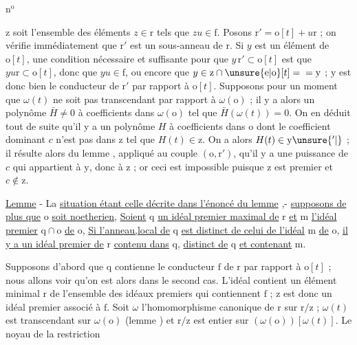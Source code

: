 n$^{\mathrm{o}}$ 

$\mathrm z$ soit l'ensemble des éléments $z\in\mathrm r$ tels que $zu\in\mathrm f$.
Posons $\mathrm r'=\mathrm o[t]+u\mathrm r$ ; on vérifie immédiatement que $\mathrm r'$
est un sous-anneau de $\mathrm r$. Si $y$ est un élément de $\mathrm o[t]$, une
condition nécessaire et suffisante pour que $y\,\mathrm r'\subset\mathrm o[t]$ est
que $yu\mathrm r\subset\mathrm o[t]$, donc que $yu\in\mathrm f$, ou encore que $y\in\mathrm z\cap\unsure{\mathrm e|\mathrm o}[t]={}
=\mathrm y$ ; $\mathrm y$ est donc bien le conducteur de $\mathrm r'$ par rapport à $\mathrm o[t]$.
Supposons pour un moment que $\omega(t)$ ne soit pas transcendant par
rapport à $\omega(\mathrm o)$ ; il y a alors un polynôme $\bar H\ne 0$ à coefficients
dans $\omega(\mathrm o)$ tel que $\bar H(\omega(t))=0$. On en déduit tout de suite qu'il
y a un polynôme $H$ à coefficients dans $\mathrm o$ dont le coefficient dominant
$c$ n'est pas dans $\mathrm z$ tel que $H(t)\in\mathrm z$. On a alors $H(t)\in\mathrm y\unsure{'|\vphantom{'}}$ ;
il résulte alors du lemme , appliqué au couple $(\mathrm o,\mathrm r')$,
qu'il y a une puissance de $c$ qui appartient à $\mathrm y$, donc à $\mathrm z$ ; or
ceci est impossible puisque $\mathrm z$ est premier et $c\notin\mathrm z$.

\uline{Lemme}  - La \uline{situation étant celle décrite dans l'énoncé du
lemme} ,- \uline{supposons de plus que} $\mathrm o$ \uline{soit noetherien}, \uline{Soient} $\mathrm q$ \uline{un
idéal premier maximal de} $\mathrm r$ \uline{et} $\mathrm m$ \uline{l'idéal premier} $\mathrm q\cap\mathrm o$ \uline{de} $\mathrm o$,
\uline{Si l'anneau,local de} $\mathrm q$ \uline{est distinct de celui de l'idéal} $\mathrm m$ \uline{de} $\mathrm o$,
\uline{il y a un idéal premier de} $\mathrm r$ \uline{contenu dans} $\mathrm q$, \uline{distinct de} $\mathrm q$
\uline{et contenant} $\mathrm m$.

Supposons d'abord que $\mathrm q$ contienne le conducteur $\mathrm f$ de $\mathrm r$
par rapport à $\mathrm o[t]$ ; nous allons voir qu'on est alors dans le
second cas. L'idéal \hspace{1.5em} contient un élément minimal $\mathrm r$ de l'ensemble
des idéaux premiers qui contiennent $\mathrm f$ ; $\mathrm z$ est donc un idéal
premier associé à $\mathrm f$. Soit $\omega$ l'homomorphisme canonique de $\mathrm r$
sur $\mathrm r/\mathrm z$ ; $\omega(t)$ est transcendant sur $\omega(\mathrm o)$ (lemme ) et $\mathrm r/\mathrm z$
est entier sur $(\omega(\mathrm o))[\omega(t)]$. Le noyau de la restriction
